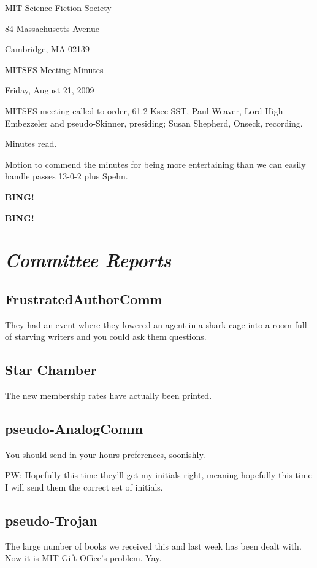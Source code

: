 \documentclass[10pt]{article}
\newcommand{\bing}{{\bf BING!} }
\newcommand{\goto}[1]{\bing \vskip 12pt \section*{{\em{#1}}}}
\newcommand{\ps}{ plus Spehn\xspace}
\begin{document}
\begin{center}

MIT Science Fiction Society

84 Massachusetts Avenue

Cambridge, MA 02139

\vspace{12pt}

MITSFS Meeting Minutes

Friday, August 21, 2009

\end{center}

\vspace{18pt}

\setlength{\parskip}{6pt}

\noindent
MITSFS meeting called to order, 61.2 Ksec SST,
Paul Weaver, Lord High Embezzeler and pseudo-Skinner, presiding; Susan Shepherd, Onseck, recording.

Minutes read.

Motion to commend the minutes for being more entertaining than we can easily handle passes 13-0-2 \ps.

\bing

\goto{Committee Reports}

\subsection*{FrustratedAuthorComm}
They had an event where they lowered an agent in a shark cage into a room full of starving writers and you could ask them questions.

\subsection*{Star Chamber}
The new membership rates have actually been printed.

\subsection*{pseudo-AnalogComm}
You should send in your hours preferences, soonishly.

PW: Hopefully this time they'll get my initials right, meaning hopefully this time I will send them the correct set of initials.

\subsection*{pseudo-Trojan}
The large number of books we received this and last week has been dealt with. Now it is MIT Gift Office's problem. Yay.
\end{document}
